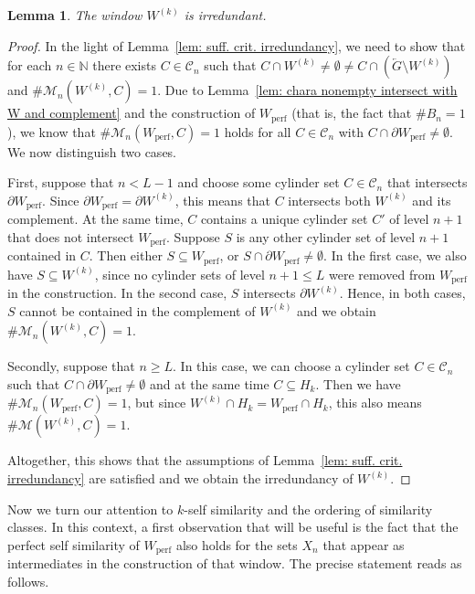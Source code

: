 \documentclass[titlepage,reqno,10pt]{amsart}
\newtheorem{lemma}[theorem]{Lemma}
\theoremstyle{definition}
\def\N{{\mathbb N}}
\def\cC{{\mathcal C}}
\def\cM{{\mathcal M}}
\begin{document}
\begin{lemma}\label{lemma: irredundant}
    The window $W^{(k)}$ is irredundant.
\end{lemma}
\begin{proof}
    In the light of Lemma~\ref{lem: suff. crit. irredundancy}, we need to show that for each $n\in\N$ there exists $C\in\cC_{n}$ such that $C\cap W^{(k)}\neq \emptyset \neq C\cap (\overleftarrow{G}\setminus W^{(k)})$ and $\#\mathcal{M}_n(W^{(k)},C)=1$. Due to Lemma~\ref{lem: chara nonempty intersect with W and complement} and the construction of $W_\mathrm{perf}$ (that is, the fact that $\# B_n=1$), we know that $\#\mathcal{M}_n(W_\mathrm{perf},C)=1$ holds for all $C\in\mathcal{C}_n$ with $C\cap \partial W_\mathrm{perf}\neq \emptyset$. We now distinguish two cases. 

    First, suppose that $n<L-1$ and choose some cylinder set $C\in \cC_n$ that intersects $\partial W_\mathrm{perf}$. Since $\partial W_\mathrm{perf}=\partial W^{(k)}$, this means that $C$ intersects both $W^{(k)}$ and its complement. At the same time, $C$ contains a unique cylinder set $C'$ of level $n+1$ that does not intersect $W_\mathrm{perf}$. Suppose $S$ is any other cylinder set of level $n+1$ contained in  $C$. Then either $S\subseteq W_\mathrm{perf}$, or $S\cap \partial W_\mathrm{perf}\neq \emptyset$. In the first case, we also have $S\subseteq W^{(k)}$, since no cylinder sets of level $n+1\leq L$ were removed from $W_\mathrm{perf}$ in the construction. In the second case, $S$ intersects $\partial W^{(k)}$. Hence, in both cases, $S$ cannot be contained in the complement of $W^{(k)}$ and we obtain $\# \cM_n(W^{(k)},C)=1$. 

    Secondly, suppose that $n\geq L$. In this case, we can choose a cylinder set $C\in\cC_n$ such that $C\cap\partial W_\mathrm{perf}\neq \emptyset$ and at the same time $C\subseteq H_k$.
    Then we have $\# \cM_n(W_\mathrm{perf}, C)=1$, but since $W^{(k)}\cap H_k = W_\mathrm{perf}\cap H_k$, this also means $\#\cM(W^{(k)},C)=1$. 

    Altogether, this shows that the assumptions of Lemma~\ref{lem: suff. crit. irredundancy} are satisfied and we obtain the irredundancy of $W^{(k)}$. 
\end{proof}

Now we turn our attention to $k$-self similarity and the ordering of similarity classes. In this context, a first observation that will be useful is the fact that the perfect self similarity of $W_\mathrm{perf}$ also holds for the sets $X_n$ that appear as intermediates in the construction of that window. The precise statement reads as follows. 
\end{document}
